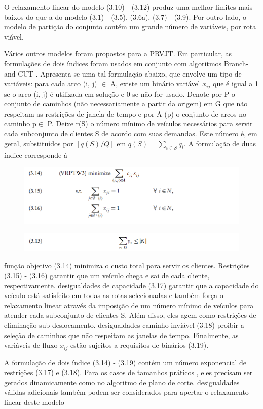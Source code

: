  
O relaxamento linear do modelo (3.10) - (3.12) produz uma melhor limites mais baixos do que a do modelo (3.1) - (3.5), (3.6a), (3.7) - (3.9). Por outro lado, o modelo de partição do conjunto contém um grande número de variáveis, por rota viável.%

Vários outros modelos foram propostos para a PRVJT. Em particular, as formulações de dois índices foram usados em conjunto com algoritmos Branch-and-CUT . Apresenta-se uma tal formulação abaixo, que envolve um tipo de variáveis: para cada arco (i, j) $\in$ A, existe um binário variável $x_{ij}$ que é igual a 1 se o arco (i, j) é utilizada em solução e 0 se não for usado. Denote por P o conjunto de caminhos (não necessariamente a partir da origem) em G que não respeitam as restrições de janela de tempo e por A (p) o conjunto de arcos no caminho p$\in$ P. Deixe r(S) o número mínimo de veículos necessários para servir cada subconjunto de clientes S de acordo com suas demandas. Este número é, em geral, substituídos por $[q(S)/Q]$ em $q(S)=\sum\limits_{i \in S}q_i $. A formulação de duas índice corresponde à 

\begin{figure}[ht!]
\centering
\includegraphics[scale=0.8]{figuras/math4.PNG}
\label{math4}
\end{figure}

\begin{figure}[ht!]
\centering
\includegraphics[scale=0.7]{figuras/math3.PNG}
\label{math5}
\end{figure}

função objetivo (3.14) minimiza o custo total para servir os clientes. Restrições (3.15) - (3.16) garantir que um veículo chega e sai de cada cliente, respectivamente. desigualdades de capacidade (3.17) garantir que a capacidade do veículo está satisfeito em todas as rotas selecionadas e também força o relaxamento linear através da imposição de um número mínimo de veículos para atender cada subconjunto de clientes S. Além disso, eles agem como restrições de eliminação sub deslocamento. desigualdades caminho inviável (3.18) proibir a seleção de caminhos que não respeitam as janelas de tempo. Finalmente, as variáveis de fluxo $x_{ij}$ estão sujeitos a requisitos de binários (3.19).

 A formulação de dois índice (3.14) - (3.19) contém um número exponencial de restrições (3.17) e (3.18). Para os casos de tamanhos práticos , eles precisam ser gerados dinamicamente como no algoritmo de plano de corte. desigualdades válidas adicionais também podem ser considerados para apertar o relaxamento linear deste modelo
 
